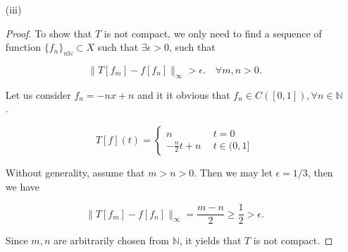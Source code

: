 \documentclass[12pt]{article}
\begin{document}
\begin{enumerate}
\begin{proof}
$$
\frac{d}{dt} \int_0^t f_1(s) ds = \frac{d}{dt} \int_0^t f_2(s) ds \quad \Rightarrow \quad f_1(t) = f_2(t), \forall t\in (0, 1].
$$

and this yields a contradiction to the assumption that $f_1 \neq f_2$. Hence, $T$ is a one-to-one map.

Next, we will show that $T$ is not an onto map.

Let $g = T[f], \forall f\in X = C([0,1])$. Since $T: X \rightarrow X$, $g\in X$. We compute $\frac{d}{dt} g(t)$,

$$
\frac{d}{dt} g(t) = -\frac{1}{t^2} \int_0^t f(s)ds + \frac{1}{t}f(t) = \frac{f(t)-g(t)}{t}. \forall t\in (0, 1).
$$

Since $f, g$ are well-defined on $[0, 1]$, we know $\frac{d}{dt} g(t)$ exists on $(0, 1)$. Also, notice that $\frac{f(t)-g(t)}{t}$ is continuous on $(0, 1)$. If we take $g(t) = |t-1/2|, t\in [0, 1]$. $g \in X$, but $\frac{d g}{dt}$ doesn't exist at $t = 1/2$, so there won't be any $ f \in X $ such that $T[f] = g$. 

Hence, $T$ is not a onto map.

\end{proof}

\item [(iii)]

\begin{proof}

To show that $T$ is not compact, we only need to find a sequence of function $\{f_n\}_{n\mathbb N} \subset X$ such that $\exists \epsilon >0$, such that 

$$
\|T[f_m] - f[f_n]\|_\infty > \epsilon. \quad \forall m, n > 0.
$$

Let us consider $f_n = -nx + n$ and it it obvious that $f_n \in C([0, 1]), \forall n\in \mathbb N$. 

$$
T[f](t) = \left\{
\begin{aligned}
n \qquad & t = 0\\
-\frac{n}{2}t + n \ \  & t \in (0, 1]
\end{aligned}
\right.
$$

Without generality, assume that $m >n > 0$. Then we may let $\epsilon = 1/3$, then we have

$$
\|T[f_m] - f[f_n]\|_\infty = \frac{m-n}{2} \geqslant \frac{1}{2} > \epsilon.
$$

Since $m, n$ are arbitrarily chosen from $\mathbb N$, it yields that $T$ is not compact.

\end{proof}



\end{enumerate}
\end{document}
